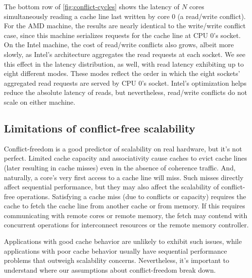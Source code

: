 
The bottom row of \cref{fig:conflict-cycles} shows the latency of $N$
cores simultaneously reading a cache line last written by core 0 (a
read/write conflict).  For the AMD machine, the results are nearly
identical to the write/write conflict case, since this machine
serializes requests for the cache line at CPU 0's socket.  On the
Intel machine, the cost of read/write conflicts also grows, albeit
more slowly, as Intel's architecture aggregates the read requests at
each socket.
%
We see this effect in the latency distribution, as well, with read
latency exhibiting up to eight different modes.  These modes reflect
the order in which the eight sockets' aggregated read requests are
served by CPU 0's socket.
Intel's optimization helps reduce the absolute
latency of reads, but nevertheless, read/write conflicts do not scale
on either machine.


\subsection{Limitations of conflict-free scalability}
\label{sec:scalability:limits}

Conflict-freedom is a good predictor of scalability on real hardware,
but it's not perfect.  Limited cache capacity and associativity cause
caches to evict cache lines (later resulting in cache
misses) even in the absence of coherence traffic.
%
And, naturally, a core's
very first access to a cache line will miss.  Such misses directly
affect sequential performance, but they may also affect the
scalability of conflict-free operations.
%
Satisfying a cache miss (due to conflicts or capacity) requires the
cache to fetch the cache line from another cache or from memory.
%
If this requires communicating with remote cores or remote memory, the
fetch may contend with concurrent operations for interconnect
resources or the remote memory controller.

Applications with good cache behavior are unlikely to exhibit such
issues, while applications with poor cache behavior usually have
sequential performance problems that outweigh scalability concerns.
Nevertheless, it's important to understand where our assumptions about
conflict-freedom break down.

